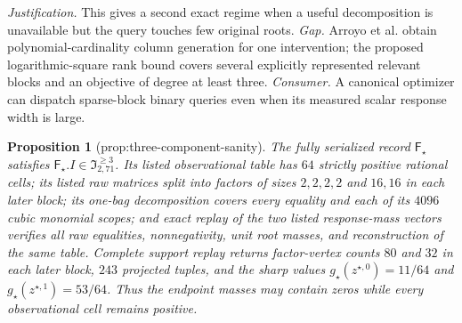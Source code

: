 \documentclass{article}
\newtheorem{proposition}{Proposition}
\begin{document}
\par\smallskip\noindent \textit{Justification.} This gives a second exact regime when a useful decomposition is unavailable but the query touches few original roots. \textit{Gap.} Arroyo et al. obtain polynomial-cardinality column generation for one intervention; the proposed logarithmic-square rank bound covers several explicitly represented relevant blocks and an objective of degree at least three. \textit{Consumer.} A canonical optimizer can dispatch sparse-block binary queries even when its measured scalar response width is large.

\begin{proposition}[prop:three-component-sanity]\label{prop:three-component-sanity}
The fully serialized record \(\mathsf F_\star\) satisfies \(\mathsf F_\star.I\in\mathfrak I_{2,71}^{\ge3}\). Its listed observational table has \(64\) strictly positive rational cells; its listed raw matrices split into factors of sizes \(2,2,2,2\) and \(16,16\) in each later block; its one-bag decomposition covers every equality and each of its \(4096\) cubic monomial scopes; and exact replay of the two listed response-mass vectors verifies all raw equalities, nonnegativity, unit root masses, and reconstruction of the same table. Complete support replay returns factor-vertex counts \(80\) and \(32\) in each later block, \(243\) projected tuples, and the sharp values \(g_\star(z^{\star,0})=11/64\) and \(g_\star(z^{\star,1})=53/64\). Thus the endpoint masses may contain zeros while every observational cell remains positive.
\end{proposition}
\end{document}
